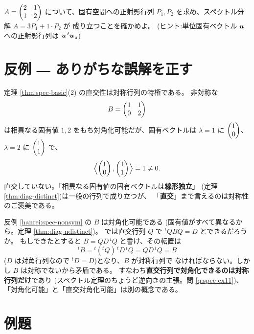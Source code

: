 \begin{mondai}\label{q:spec}
$A = \begin{pmatrix}2 & 1 \\ 1 & 2\end{pmatrix}$ について、固有空間への正射影行列
$P_1, P_2$ を求め、スペクトル分解 $A = 3P_1 + 1 \cdot P_2$ が
成り立つことを確かめよ。
(ヒント:単位固有ベクトル $\bm{u}$ への正射影行列は $\bm{u}\,{}^t\bm{u}$。)
\end{mondai}

\section{反例 ― ありがちな誤解を正す}

\begin{hanrei}[対称でない行列では固有ベクトルは直交しない]\label{hanrei:spec-nonsym}
定理 \ref{thm:spec-basic}(2) の直交性は対称行列の特権である。
非対称な
\[
B = \begin{pmatrix}1 & 1 \\ 0 & 2\end{pmatrix}
\]
は相異なる固有値 $1, 2$ をもち対角化可能だが、固有ベクトルは
$\lambda = 1$ に $\begin{pmatrix}1 \\ 0\end{pmatrix}$、$\lambda = 2$ に $\begin{pmatrix}1 \\ 1\end{pmatrix}$ で、
\[
\Bigl\langle \begin{pmatrix}1 \\ 0\end{pmatrix}, \begin{pmatrix}1 \\ 1\end{pmatrix} \Bigr\rangle = 1 \neq 0.
\]
直交していない。「相異なる固有値の固有ベクトルは\textbf{線形独立}」
(定理 \ref{thm:diag-distinct})は一般の行列で成り立つが、
「\textbf{直交}」まで言えるのは対称性のご褒美である。
\end{hanrei}

\begin{hanrei}\label{hanrei:spec-notdiag}
反例 \ref{hanrei:spec-nonsym} の $B$ は対角化可能である
(固有値がすべて異なるから。定理 \ref{thm:diag-ndistinct})。
では直交行列 $Q$ で ${}^t Q B Q = D$ とできるだろうか。
もしできたとすると $B = QD\,{}^t Q$ と書け、その転置は
\[
{}^t\!B = {}^t({}^t Q)\,{}^t\!D\,{}^t Q = QD\,{}^t Q = B
\]
($D$ は対角行列なので ${}^t\!D = D$)となり、$B$ が対称行列で
なければならない。しかし $B$ は対称でないから矛盾である。
すなわち\textbf{直交行列で対角化できるのは対称行列だけ}であり
(スペクトル定理のちょうど逆向きの主張。問 \ref{q:spec-ex11})、
「対角化可能」と「直交対角化可能」は別の概念である。
\end{hanrei}

\section{例題}

